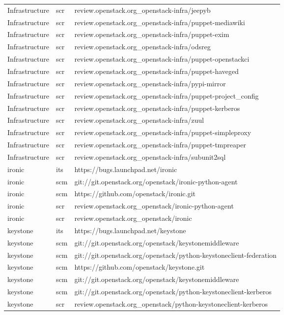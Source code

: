 \begin{center}
\begin{longtable}{|p{4cm}|p{1cm}|p{10cm}|}
Infrastructure&scr&review.openstack.org\_openstack-infra/jeepyb\\
Infrastructure&scr&review.openstack.org\_openstack-infra/puppet-mediawiki\\
Infrastructure&scr&review.openstack.org\_openstack-infra/puppet-exim\\
Infrastructure&scr&review.openstack.org\_openstack-infra/odsreg\\
Infrastructure&scr&review.openstack.org\_openstack-infra/puppet-openstackci\\
Infrastructure&scr&review.openstack.org\_openstack-infra/puppet-haveged\\
Infrastructure&scr&review.openstack.org\_openstack-infra/pypi-mirror\\
Infrastructure&scr&review.openstack.org\_openstack-infra/puppet-project\_config\\
Infrastructure&scr&review.openstack.org\_openstack-infra/puppet-kerberos\\
Infrastructure&scr&review.openstack.org\_openstack-infra/zuul\\
Infrastructure&scr&review.openstack.org\_openstack-infra/puppet-simpleproxy\\
Infrastructure&scr&review.openstack.org\_openstack-infra/puppet-tmpreaper\\
Infrastructure&scr&review.openstack.org\_openstack-infra/subunit2sql\\
ironic&its&https://bugs.launchpad.net/ironic\\
ironic&scm&git://git.openstack.org/openstack/ironic-python-agent\\
ironic&scm&https://github.com/openstack/ironic.git\\
ironic&scr&review.openstack.org\_openstack/ironic-python-agent\\
ironic&scr&review.openstack.org\_openstack/ironic\\
keystone&its&https://bugs.launchpad.net/keystone\\
keystone&scm&git://git.openstack.org/openstack/keystonemiddleware\\
keystone&scm&git://git.openstack.org/openstack/python-keystoneclient-federation\\
keystone&scm&https://github.com/openstack/keystone.git\\
keystone&scm&git://git.openstack.org/openstack/keystonemiddleware\\
keystone&scm&git://git.openstack.org/openstack/python-keystoneclient-kerberos\\
keystone&scr&review.openstack.org\_openstack/python-keystoneclient-kerberos\\

\end{longtable}
\end{center}
